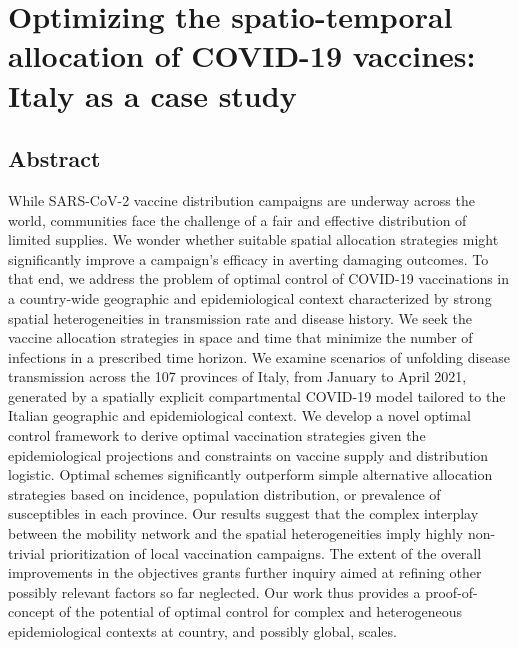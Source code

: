 \chapter{Optimizing the spatio-temporal allocation of COVID-19 vaccines: Italy as a case study}
\label{ch:covid-italy-ocp}


\section{Abstract}
While SARS-CoV-2 vaccine distribution campaigns are underway across the world, communities face the challenge of a fair and effective distribution of limited supplies. We wonder whether suitable spatial allocation strategies might significantly improve a campaign's efficacy in averting damaging outcomes. To that end, we address the problem of optimal control of COVID-19 vaccinations in a country-wide geographic and epidemiological context characterized by strong spatial heterogeneities in transmission rate and disease history. We seek the vaccine allocation strategies in space and time that minimize the number of infections in a prescribed time horizon. We examine scenarios of unfolding disease transmission across the 107 provinces of Italy, from January to April 2021, generated by a spatially explicit compartmental COVID-19 model tailored to the Italian geographic and epidemiological context. We develop a novel optimal control framework to derive optimal vaccination strategies given the epidemiological projections and constraints on vaccine supply and distribution logistic. Optimal schemes significantly outperform simple alternative allocation strategies based on incidence, population distribution, or prevalence of susceptibles in each province. Our results suggest that the complex interplay between the mobility network and the spatial heterogeneities imply highly non-trivial prioritization of local vaccination campaigns. The extent of the overall improvements in the objectives grants further inquiry aimed at refining other possibly relevant factors so far neglected. Our work thus provides a proof-of-concept of the potential of optimal control for complex and heterogeneous epidemiological contexts at country, and possibly global, scales.

